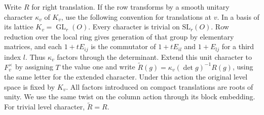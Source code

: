 \documentclass[a4paper,11pt]{article}
\theoremstyle{definition}
\theoremstyle{remark}
\numberwithin{equation}{section}
\newcommand{\GL}{\operatorname{GL}}
\begin{document}
Write \(R\) for right translation. If the row transforms by
a smooth unitary character \(\kappa_v\) of \(K_v\), use the
following convention for translations at \(v\). In a basis of
its lattice \(K_v=\GL_r(O)\). Every character is trivial on
\(\mathrm{SL}_r(O)\). Row reduction over the local ring gives
generation of that group by elementary matrices, and each
\(1+tE_{ij}\) is the commutator of \(1+tE_{il}\) and
\(1+E_{lj}\) for a third index \(l\). Thus \(\kappa_v\)
factors through the determinant. Extend this unit character
to \(F_v^\times\) by assigning \(T\) the value one and write
\(\widetilde R(g)=\kappa_v(\det g)^{-1}R(g)\), using the
same letter for the extended character. Under this action
the original level space is fixed by \(K_v\). All factors
introduced on compact translations are roots of unity. We use
the same twist on the column action through its block embedding.
For trivial level character, \(\widetilde R=R\).
\end{document}
